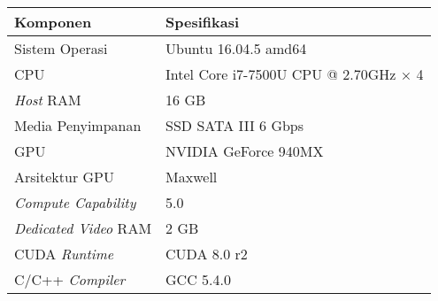\begin{tabular}{|l|l|}

\hline
\rowcolor{gray!10}
Komponen & Spesifikasi \\
\hline

Sistem Operasi & Ubuntu 16.04.5 amd64 \\
\hline

CPU & Intel Core i7-7500U CPU @ 2.70GHz × 4 \\
\hline

\emph{Host} RAM & 16 GB \\
\hline

Media Penyimpanan & SSD SATA III 6 Gbps \\
\hline

GPU & NVIDIA GeForce 940MX \\
\hline

Arsitektur GPU & Maxwell \\
\hline

\emph{Compute Capability} & 5.0 \\
\hline

\emph{Dedicated Video} RAM & 2 GB \\
\hline

CUDA \emph{Runtime} & CUDA 8.0 r2 \\
\hline

C/C++ \emph{Compiler} & GCC 5.4.0 \\
\hline

\end{tabular}
